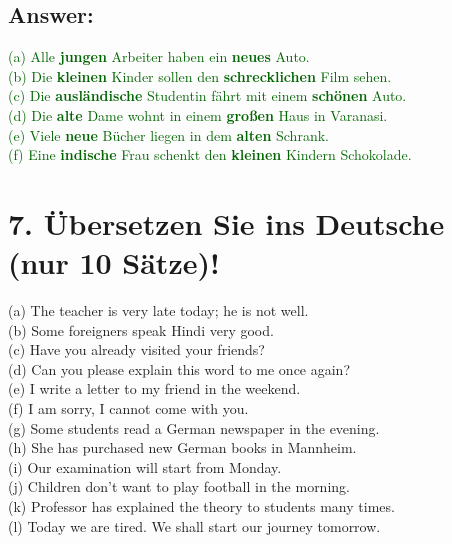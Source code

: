 \documentclass[a4paper,12pt]{article}
\begin{document}
\subsection*{Answer:}
\textcolor{darkgreen}{(a) Alle \textbf{jungen} Arbeiter haben ein \textbf{neues} Auto.}\\
\textcolor{darkgreen}{(b) Die \textbf{kleinen} Kinder sollen den \textbf{schrecklichen} Film sehen.}\\
\textcolor{darkgreen}{(c) Die \textbf{ausländische} Studentin fährt mit einem \textbf{schönen} Auto.}\\
\textcolor{darkgreen}{(d) Die \textbf{alte} Dame wohnt in einem \textbf{großen} Haus in Varanasi.}\\
\textcolor{darkgreen}{(e) Viele \textbf{neue} Bücher liegen in dem \textbf{alten} Schrank.}\\
\textcolor{darkgreen}{(f) Eine \textbf{indische} Frau schenkt den \textbf{kleinen} Kindern Schokolade.}\\




\vspace{1cm}

\section*{7. Übersetzen Sie ins Deutsche (nur 10 Sätze)!}

(a) The teacher is very late today; he is not well.\\
(b) Some foreigners speak Hindi very good.\\
(c) Have you already visited your friends?\\
(d) Can you please explain this word to me once again?\\
(e) I write a letter to my friend in the weekend.\\
(f) I am sorry, I cannot come with you.\\
(g) Some students read a German newspaper in the evening.\\
(h) She has purchased new German books in Mannheim.\\
(i) Our examination will start from Monday.\\
(j) Children don't want to play football in the morning.\\
(k) Professor has explained the theory to students many times.\\
(l) Today we are tired. We shall start our journey tomorrow.
\end{document}
